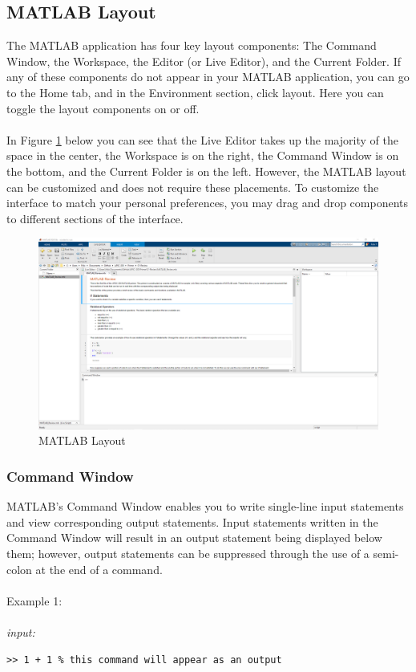 \documentclass[../MATLAB_Primer.tex]{subfiles}
\begin{document}
\subsection{MATLAB Layout} \label{MATLAB Layout}
The MATLAB application has four key layout components: The Command Window, the Workspace, the Editor (or Live Editor), and the Current Folder. If any of these components do not appear in your MATLAB application, you can go to the Home tab, and in the Environment section, click layout. Here you can toggle the layout components on or off.
\\ \\
In Figure \ref{fig:matlabLayout} below you can see that the Live Editor takes up the majority of the space in the center, the Workspace is on the right, the Command Window is on the bottom, and the Current Folder is on the left. However, the MATLAB layout can be customized and does not require these placements. To customize the interface to match your personal preferences, you may drag and drop components to different sections of the interface.
\begin{figure}[h]
    \centering
    \includegraphics[width=426pt]{images/matlabLayout.PNG}
    \caption{MATLAB Layout}
    \label{fig:matlabLayout}
\end{figure}

\subsubsection{Command Window}
MATLAB's Command Window enables you to write single-line input statements and view corresponding output statements. Input statements written in the Command Window will result in an output statement being displayed below them; however, output statements can be suppressed through the use of a semi-colon at the end of a command.
\\ \\
Example 1:
\\ \\
\textit{input:}
\begin{lstlisting}[frame=single]
>> 1 + 1 % this command will appear as an output
\end{lstlisting}
\end{document}
